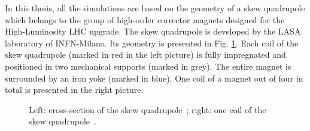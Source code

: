 
In this thesis, all the simulations are based on the geometry of a skew quadrupole which belongs to the group of high-order corrector magnets designed for the High-Luminosity LHC upgrade. The skew quadrupole is developed by the LASA laboratory of INFN-Milano. Its geometry is presented in Fig. \ref{fig:Skew_quad_geometry}. Each coil of the skew quadrupole (marked in red in the left picture) is fully impregnated and positioned in two mechanical supports (marked in grey). The entire magnet is surrounded by an iron yoke (marked in blue). One coil of a magnet out of four in total is presented in the right picture.

\begin{figure}[H]
    \centering
     \caption{Left: cross-section of the skew quadrupole~\cite[p.~103-105]{hl_lhc_tech_design_report_v01}; right: one coil of the skew quadrupole~\cite{marco_prioli_mails}.}
    \label{fig:Skew_quad_geometry}
\end{figure}

